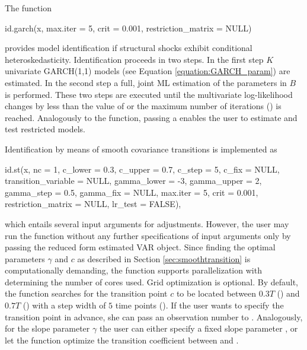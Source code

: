 \documentclass[nojss]{jss}\usepackage[]{graphicx}\usepackage[]{color}
\begin{document}
The function
\begin{CodeChunk}
	\begin{CodeInput}
id.garch(x, max.iter = 5, crit = 0.001, restriction_matrix = NULL)
	\end{CodeInput}
\end{CodeChunk}
provides model identification if structural shocks exhibit conditional heteroskedasticity. Identification proceeds in two steps. In the first step $K$ univariate GARCH(1,1) models (see Equation \ref{equation:GARCH_param}) are estimated. In the second step a full, joint ML estimation of the parameters in $B$ is performed. These two steps are  executed until the multivariate log-likelihood changes by less than the value of  or the maximum number of iterations () is reached. Analogously to the  function, passing a  enables the user to estimate and test restricted models.

Identification by means of smooth covariance transitions is implemented as

\begin{CodeChunk}
	\begin{CodeInput}
id.st(x, nc = 1, c_lower = 0.3, c_upper = 0.7, c_step = 5, c_fix = NULL,
  transition_variable = NULL, gamma_lower = -3, gamma_upper = 2,
  gamma_step = 0.5, gamma_fix = NULL, max.iter = 5, crit = 0.001,
  restriction_matrix = NULL, lr_test = FALSE),
	\end{CodeInput}
\end{CodeChunk}
which entails several input arguments for adjustments. However, the user may run the function without any further specifications of input arguments only by passing the reduced form estimated VAR object. Since finding the optimal parameters $\gamma$ and $c$ as described in Section \ref{sec:smoothtransition} is computationally demanding, the  function supports parallelization with  determining the number of cores used. Grid optimization  is optional. By default, the function searches for the transition point $c$ to be located between $0.3T$ () and $0.7T$ () with a step width of $5$ time points (). If the user wants to specify the transition point in advance, she can pass an observation number to . Analogously, for the slope parameter $\gamma$ the user can either specify a fixed slope parameter , or let the function optimize the transition coefficient between  and .
\end{document}
